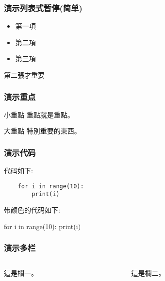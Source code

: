 \documentclass[xcolor=dvipsnames]{beamer}
\begin{document}
\begin{frame}
    \frametitle{演示列表式暂停(简单)}
    \begin{itemize}[<+->]
        \item
            第一項
        \item
            第二項
        \item
            第三項
    \end{itemize} 
    \alert<2>{第二張}才重要
\end{frame}

\begin{frame}
    \frametitle{演示重点}
    \begin{block}{小重點} 
        重點就是重點。 
    \end{block}

    \begin{alertblock}{大重點}
        特別重要的東西。 
    \end{alertblock} 
\end{frame}

\begin{frame}[fragile]
    \frametitle{演示代码}
    代码如下:
    \begin{verbatim} 
    for i in range(10): 
        print(i)
    \end{verbatim}
    带颜色的代码如下:
    \begin{semiverbatim} 
    for \alert{i} in range(10): 
        print(\alert{i})
    \end{semiverbatim} 
\end{frame}


\begin{frame}
    \frametitle{演示多栏}
    \begin{columns} 
        \begin{column}{5cm} 
            這是欄一。 
        \end{column}
        \begin{column}{5cm} 
            這是欄二。 
        \end{column}
    \end{columns}
\end{frame}
\end{document}
